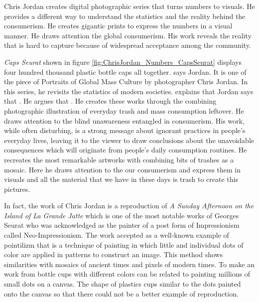 Chris Jordan creates digital photographic series that turns numbers to visuals. He provides a different way to understand the statistics and the reality behind the consumerism. He creates gigantic prints to express the numbers in a visual manner. He draws attention the global consumerism. His work reveals the reality that is hard to capture because of widespread acceptance among the community.

\textit{Caps Seurat} shown in figure \ref{fig:ChrisJordan_Numbers_CapsSeurat} displays four hundred thousand plastic bottle caps all together.  says Jordan. It is one of the piece of Portraits of Global Mass Culture by photographer Chris Jordan. In this series, he revisits the statistics of modern societies. \cite{boustead2015impossible} explains that  Jordan says that  \citep[as cite in][]{boustead2015impossible}. He argues that  \citep[as cite in][]{boustead2015impossible}. He creates these works through the combining photographic illustration of everyday trash and mass consumption leftover. He draws attention to the blind unawareness entangled in consumerism. His work, while often disturbing, is a strong message about ignorant practices in people's everyday lives, leaving it to the viewer to draw conclusions about the unavoidable consequences which will originate from people's daily consumption routines. He recreates the most remarkable artworks with combining bits of trashes as a mosaic. Here he draws attention to the our consumerism and express them in visuals and all the material that we have in these days is trash to create this pictures.

In fact, the work of Chris Jordan is a reproduction of \textit{A Sunday Afternoon on the Island of La Grande Jatte} which is one of the most notable works of Georges Seurat who was acknowledged as the painter of a post form of Impressionism called Neo-Impressionism. The work accepted as a well-known example of pointilizm that is a technique of painting in which little and individual dots of color are applied in patterns to construct an image. This method shows similarities with mosaics of ancient times and pixels of modern times. To make an work from bottle cups with different colors can be related to painting millions of small dots on a canvas. The shape of plastics cups similar to the dots painted onto the canvas so that there could not be a better example of reproduction.

